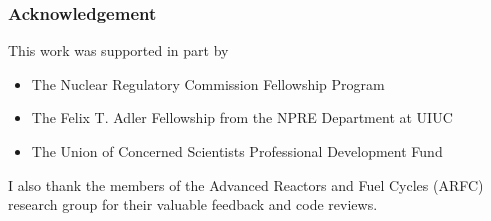 \begin{frame}
  \frametitle{Acknowledgement}
    This work was supported in part by 
    \begin{itemize}
      \item The Nuclear Regulatory Commission Fellowship Program
      \item The Felix T. Adler Fellowship from the NPRE Department at UIUC
      \item The Union of Concerned Scientists Professional Development Fund
    \end{itemize}

    I also thank the members of the Advanced Reactors and Fuel Cycles (ARFC) research group for
    their valuable feedback and code reviews.
\end{frame}
